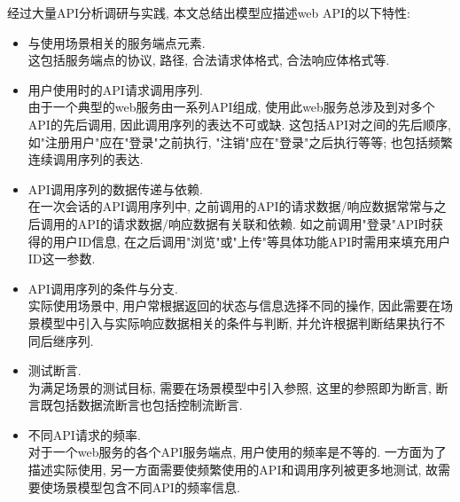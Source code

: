         经过大量API分析调研与实践, 本文总结出模型应描述web API的以下特性:
        \begin{itemize}
            \item 与使用场景相关的服务端点元素. \\
            这包括服务端点的协议, 路径, 合法请求体格式, 合法响应体格式等.
            
            \item 用户使用时的API请求调用序列. \\ 由于一个典型的web服务由一系列API组成, 使用此web服务总涉及到对多个API的先后调用, 因此调用序列的表达不可或缺. 这包括API对之间的先后顺序, 如"注册用户"应在"登录"之前执行, "注销"应在"登录"之后执行等等; 也包括频繁连续调用序列的表达.
            
            \item API调用序列的数据传递与依赖. \\
            在一次会话的API调用序列中, 之前调用的API的请求数据/响应数据常常与之后调用的API的请求数据/响应数据有关联和依赖. 如之前调用"登录"API时获得的用户ID信息, 在之后调用"浏览"或"上传"等具体功能API时需用来填充用户ID这一参数.
            
            \item API调用序列的条件与分支. \\
            实际使用场景中, 用户常根据返回的状态与信息选择不同的操作, 因此需要在场景模型中引入与实际响应数据相关的条件与判断, 并允许根据判断结果执行不同后继序列.
            
            \item 测试断言. \\
            为满足场景的测试目标, 需要在场景模型中引入参照, 这里的参照即为断言, 断言既包括数据流断言也包括控制流断言.
            
            \item 不同API请求的频率.\\
            对于一个web服务的各个API服务端点, 用户使用的频率是不等的. 一方面为了描述实际使用, 另一方面需要使频繁使用的API和调用序列被更多地测试, 故需要使场景模型包含不同API的频率信息.
        \end{itemize}
        
